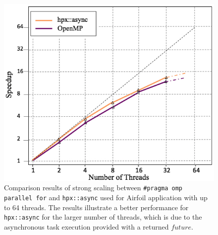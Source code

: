 \documentclass[conference]{IEEEtran}
\begin{document}
\begin{figure} 
\begin{center}
\centering
\includegraphics[width=1\columnwidth]{Pictures/async.jpg}
\caption {\small{Comparison results of strong scaling between \texttt{\#pragma omp parallel for} and \texttt{hpx::async} used for Airfoil application
with up to 64 threads. The results illustrate a better performance for \texttt{hpx::async} for the larger number of threads, which is due to the asynchronous task execution provided with a returned $future$. }}
\label{f3}
\end{center}
\end{figure}
\end{document}
